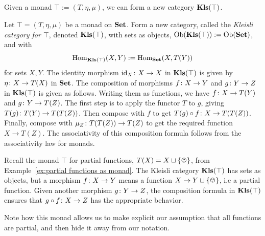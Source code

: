 \documentclass[CT4S-EN-RU]{subfiles}
\begin{document}

\subsection{}\label{sec:kleisli}

\begin{blockENG}
Given a monad $\top:=(T,\eta,\mu)$, we can form a new category ${\mathbf{Kls}}(\top)$.
\end{blockENG}

\begin{blockRUS}
\end{blockRUS}

\begin{definitionENG}\label{def:kleisli}
Let $\top=(T,\eta,\mu)$ be a monad on ${\mathbf{Set}}$. Form a new category, called the {\em Kleisli category for $\top$}, denoted ${\mathbf{Kls}}(\top)$, with sets as objects, $\textnormal{Ob}({\mathbf{Kls}}(\top)):=\textnormal{Ob}({\mathbf{Set}})$, and with $$\textnormal{Hom}_{{\mathbf{Kls}}(\top)}(X,Y):=\textnormal{Hom}_{\mathbf{Set}}(X,T(Y))$$ for sets $X,Y$. The identity morphism $\textnormal{id}_X\colon X\rightarrow X$ in ${\mathbf{Kls}}(\top)$ is given by $\eta\colon X\rightarrow T(X)$ in ${\mathbf{Set}}$. The composition of morphisms $f\colon X\rightarrow Y$ and $g\colon Y\rightarrow Z$ in ${\mathbf{Kls}}(\top)$ is given as follows. Writing them as functions, we have $f\colon X\rightarrow T(Y)$ and $g\colon Y\rightarrow T(Z)$. The first step is to apply the functor $T$ to $g$, giving $T(g)\colon T(Y)\rightarrow T(T(Z))$. Then compose with $f$ to get $T(g)\circ f\colon X\rightarrow T(T(Z))$. Finally, compose with $\mu_Z\colon T(T(Z))\rightarrow T(Z)$ to get the required function $X\to T(Z)$. The associativity of this composition formula follows from the associativity law for monads.
\end{definitionENG}

\begin{definitionRUS}\label{def:kleisli}
\end{definitionRUS}

\begin{exampleENG}
Recall the monad $\top$ for partial functions, $T(X)=X\sqcup\singleton$, from Example~\ref{ex:partial functions as monad}. The Kleisli category ${\mathbf{Kls}}(\top)$ has sets as objects, but a morphism $f\colon X\rightarrow Y$ means a function $X\to Y\sqcup\singleton$, i.e a partial function. Given another morphism $g\colon Y\rightarrow Z$, the composition formula in ${\mathbf{Kls}}(\top)$ ensures that $g\circ f\colon X\rightarrow Z$ has the appropriate behavior.

Note how this monad allows us to make explicit our assumption that all functions are partial, and then hide it away from our notation.
\end{exampleENG}
\end{document}
